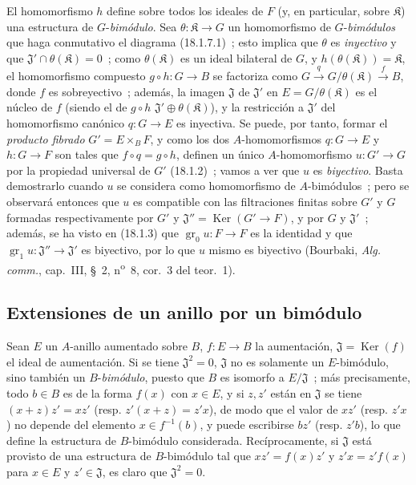 \begin{env}[18.1.7]
El homomorfismo $h$ define sobre todos los ideales de $F$ (y, en particular, sobre
$\mathfrak K$) una estructura de $G$-\emph{bimódulo}. Sea
$\theta:\mathfrak K\to G$ un homomorfismo de $G$-\emph{bimódulos} que haga
conmutativo el diagrama (18.1.7.1)~; esto implica que $\theta$ es
\emph{inyectivo} y que $\mathfrak{J}'\cap\theta(\mathfrak K)=0$~; como
$\theta(\mathfrak K)$ es un ideal bilateral de $G$, y
$h(\theta(\mathfrak K))=\mathfrak K$, el homomorfismo compuesto
$g\circ h:G\to B$ se factoriza como
$G\xrightarrow{q}G/\theta(\mathfrak K)\xrightarrow{f}B$, donde $f$ es
sobreyectivo~; además, la imagen $\mathfrak{J}$ de $\mathfrak{J}'$ en
$E=G/\theta(\mathfrak K)$ es el núcleo de $f$ (siendo el de $g\circ h$
$\mathfrak{J}'\oplus\theta(\mathfrak K)$), y la restricción a
$\mathfrak{J}'$ del homomorfismo canónico $q:G\to E$ es inyectiva. Se
puede, por tanto, formar el \emph{producto fibrado} $G'=E\times_BF$, y como los dos
$A$-homomorfismos $q:G\to E$ y $h:G\to F$ son tales que
$f\circ q=g\circ h$, definen un único $A$-homomorfismo $u:G'\to G$
por la propiedad universal de $G'$ (18.1.2)~; vamos a ver que $u$ es
\emph{biyectivo}. Basta demostrarlo cuando $u$ se considera como
homomorfismo de $A$-bimódulos~; pero se observará entonces que $u$ es compatible
con las filtraciones finitas sobre $G'$ y $G$ formadas respectivamente por $G'$
y $\mathfrak{J}''=\operatorname{Ker}(G'\to F)$, y por $G$ y
$\mathfrak{J}'$~; además, se ha visto en (18.1.3) que
$\operatorname{gr}_0u:F\to F$ es la identidad y que
$\operatorname{gr}_1u:\mathfrak{J}''\to\mathfrak{J}'$ es biyectivo, por lo que $u$
mismo es biyectivo (Bourbaki, \emph{Alg. comm.}, cap.~III, \S~2,
n\textsuperscript{o}~8, cor.~3 del teor.~1).
\end{env}

\subsection{Extensiones de un anillo por un bimódulo}
\label{subsection:0.18.2-es}

\begin{env}[18.2.1]
\label{0.18.2.1-es}
Sean $E$ un $A$-anillo aumentado sobre $B$, $f:E\to B$ la aumentación,
$\mathfrak{J}=\operatorname{Ker}(f)$ el ideal de aumentación. Si se tiene
$\mathfrak{J}^2=0$, $\mathfrak{J}$ no es solamente un $E$-bimódulo, sino
también un $B$-\emph{bimódulo}, puesto que $B$ es isomorfo a
$E/\mathfrak{J}$~; más precisamente, todo $b\in B$ es de la forma $f(x)$
con $x\in E$, y si $z,z'$ están en $\mathfrak{J}$ se tiene
$(x+z)z'=xz'$ (resp. $z'(x+z)=z'x$), de modo que el valor de $xz'$ (resp.
$z'x$) no depende del elemento $x\in f^{-1}(b)$, y puede escribirse $bz'$
(resp. $z'b$), lo que define la estructura de $B$-bimódulo considerada.
Recíprocamente, si $\mathfrak{J}$ está provisto de una estructura de $B$-bimódulo tal
que $xz'=f(x)z'$ y $z'x=z'f(x)$ para $x\in E$ y
$z'\in\mathfrak{J}$, es claro que $\mathfrak{J}^2=0$.
\end{env}

